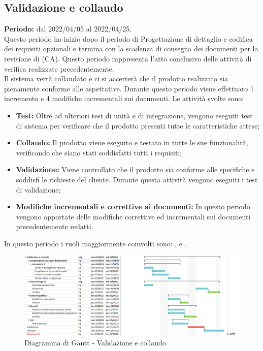 
\subsection{Validazione e collaudo} \label{subsection:pianificazione_validazione}
  \textbf{Periodo:} dal 2022/04/05 al 2022/04/25.
  \bigskip
  \\Questo periodo ha inizio dopo il periodo di Progettazione di dettaglio e codifica dei requisiti opzionali e termina con la scadenza di consegna dei documenti per la revisione di \CA{} (CA\glo{}).
  Questo periodo rappresenta l'atto conclusivo delle attività di verifica realizzate precedentemente.
  \\Il sistema verrà collaudato e ci si accerterà che il prodotto realizzato
  sia pienamente conforme alle aspettative.
  Durante questo periodo viene effettuato 1 incremento e 4 modifiche incrementali sui documenti. 
  Le attività svolte sono:
  \begin{itemize}
    \item \textbf{Test:} Oltre ad ulteriori test di unità e di integrazione, vengono eseguiti test di sistema per verificare che il prodotto presenti tutte le caratteristiche attese;
    \item \textbf{Collaudo:} Il prodotto viene eseguito e testato in tutte le sue funzionalità, verificando che siano stati soddisfatti tutti i requisiti;
    \item \textbf{Validazione:} Viene controllato che il prodotto sia conforme alle specifiche e soddisfi le richieste del cliente.
    Durante questa attività vengono eseguiti i test di validazione;
    \item \textbf{Modifiche incrementali e correttive ai documenti:} In questo periodo vengono apportate delle modifiche correttive ed incrementali sui documenti precedentemente redatti.
  \end{itemize}
  In questo periodo i ruoli maggiormente coinvolti sono: \roleDesignerLow{}, \roleProgrammerLow{} e \roleVerifierLow{}.
  \bigskip
  \begin{figure}[H]
    \centering
     \includegraphics[scale=0.54]{immagini/validazione_collaudo.png}
     \caption{Diagramma di Gantt - Validazione e collaudo}
   \end{figure}
   \pagebreak